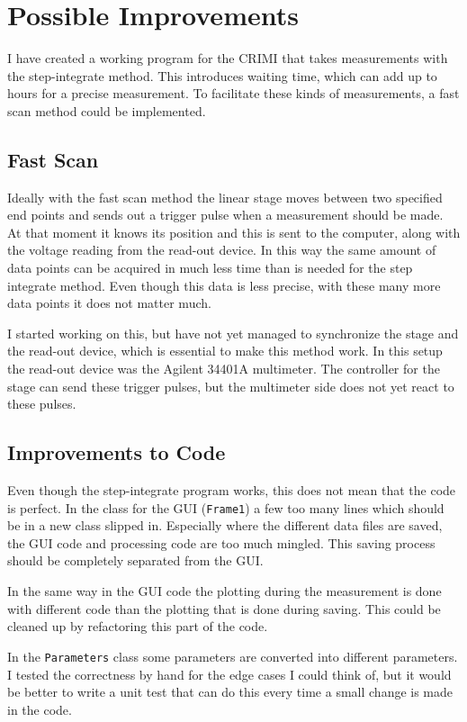 
\section{Possible Improvements}

I have created a working program for the CRIMI that takes measurements with the step-integrate method. This introduces waiting time, which can add up to hours for a precise measurement. To facilitate these kinds of measurements, a fast scan method could be implemented.

\subsection{Fast Scan}
Ideally with the fast scan method the linear stage moves between two specified end points and sends out a trigger pulse when a measurement should be made. At that moment it knows its position and this is sent to the computer, along with the voltage reading from the read-out device. In this way the same amount of data points can be acquired in much less time than is needed for the step integrate method. Even though this data is less precise, with these many more data points it does not matter much.

I started working on this, but have not yet managed to synchronize the stage and the read-out device, which is essential to make this method work. In this setup the read-out device was the Agilent 34401A multimeter. The controller for the stage can send these trigger pulses, but the multimeter side does not yet react to these pulses.

\subsection{Improvements to Code}
Even though the step-integrate program works, this does not mean that the code is perfect. In the class for the GUI (\verb!Frame1!) a few too many lines which should be in a new class slipped in. Especially where the different data files are saved, the GUI code and processing code are too much mingled. This saving process should be completely separated from the GUI.

In the same way in the GUI code the plotting during the measurement is done with different code than the plotting that is done during saving. This could be cleaned up by refactoring this part of the code.

In the \verb!Parameters! class some parameters are converted into different parameters. I tested the correctness by hand for the edge cases I could think of, but it would be better to write a unit test that can do this every time a small change is made in the code. 


